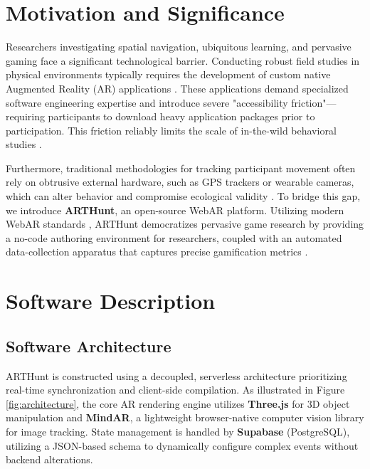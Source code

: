 \documentclass[3p,times]{elsarticle}
\begin{document}
\section{Motivation and Significance}
\label{sec:motivation}
Researchers investigating spatial navigation, ubiquitous learning, and pervasive gaming face a significant technological barrier. Conducting robust field studies in physical environments typically requires the development of custom native Augmented Reality (AR) applications \cite{akcayir2017review}. These applications demand specialized software engineering expertise and introduce severe "accessibility friction"—requiring participants to download heavy application packages prior to participation. This friction reliably limits the scale of in-the-wild behavioral studies \cite{billinghurst2015survey}.

Furthermore, traditional methodologies for tracking participant movement often rely on obtrusive external hardware, such as GPS trackers or wearable cameras, which can alter behavior and compromise ecological validity \cite{speicher2018what}. To bridge this gap, we introduce \textbf{ARTHunt}, an open-source WebAR platform. Utilizing modern WebAR standards \cite{qiao2019webar}, ARTHunt democratizes pervasive game research by providing a no-code authoring environment for researchers, coupled with an automated data-collection apparatus that captures precise gamification metrics \cite{hamari2014does}.

\section{Software Description}
\label{sec:description}

\subsection{Software Architecture}
ARTHunt is constructed using a decoupled, serverless architecture prioritizing real-time synchronization and client-side compilation. As illustrated in Figure \ref{fig:architecture}, the core AR rendering engine utilizes \textbf{Three.js} for 3D object manipulation and \textbf{MindAR}, a lightweight browser-native computer vision library for image tracking. State management is handled by \textbf{Supabase} (PostgreSQL), utilizing a JSON-based schema to dynamically configure complex events without backend alterations.
\end{document}

